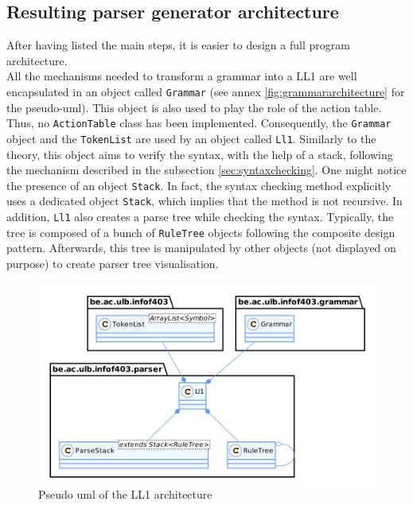 \documentclass[a4paper,11pt]{article}
\begin{document}
  \subsection{Resulting parser generator architecture}
    After having listed the main steps, it is easier to design a full program architecture.\\
    All the mechanisms needed to transform a grammar into a LL1 are well encapsulated in an object called \verb|Grammar| (see annex \ref{fig:grammararchitecture} for the pseudo-uml). This object is also used to play the role of the action table. Thus, no \verb|ActionTable| class has been implemented. Consequently, the \verb|Grammar| object and the \verb|TokenList| are used by an object called \verb|Ll1|. Similarly to the theory, this object aims to verify the syntax, with the help of a stack, following the mechanism described in the subsection \ref{sec:syntaxchecking}. One might notice the presence of an object \verb|Stack|. In fact, the syntax checking method explicitly uses a dedicated object \verb|Stack|, which implies that the method is not recursive. In addition, \verb|Ll1| also creates a parse tree while checking the syntax. Typically, the tree is composed of a bunch of \verb|RuleTree| objects following the composite design pattern. Afterwards, this tree is manipulated by other objects (not displayed on purpose) to create parser tree visualisation.
    \begin{figure}[h!]
      \centering
      \includegraphics[scale=0.275]{./img/class_ll1.png}
      \caption{Pseudo uml of the LL1 architecture}
      \label{fig:architecturell1}
    \end{figure}
  
\end{document}
